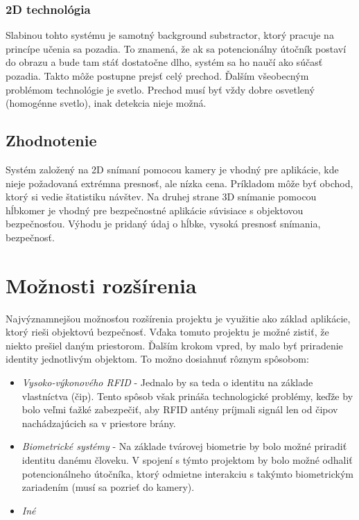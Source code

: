 \subsubsection{2D technológia}
Slabinou tohto systému je samotný background substractor, ktorý pracuje na princípe učenia sa pozadia. To znamená, že ak sa potencionálny útočník  postaví do obrazu a bude tam stáť dostatočne dlho, systém sa ho naučí ako súčasť pozadia. Takto môže postupne prejsť celý prechod. Ďalším všeobecným problémom technológie je svetlo. Prechod musí byť vždy dobre osvetlený (homogénne svetlo), inak detekcia nieje možná. 

\vspace{5mm}

\subsection{Zhodnotenie}
Systém založený na 2D snímaní pomocou kamery je vhodný pre aplikácie, kde nieje požadovaná extrémna presnosť, ale nízka cena. Príkladom môže byť obchod, ktorý si vedie štatistiku návštev. Na druhej strane 3D snímanie pomocou hĺbkomer je vhodný pre bezpečnostné aplikácie súvisiace s objektovou bezpečnosťou. Výhodu je pridaný údaj o hĺbke, vysoká presnosť snímania, bezpečnosť.       


\section{Možnosti rozšírenia}
Najvýznamnejšou možnosťou rozšírenia projektu je využitie ako základ aplikácie, ktorý rieši objektovú bezpečnosť. Vďaka tomuto projektu je možné zistiť, že niekto prešiel daným priestorom. Ďalším krokom vpred, by malo byť priradenie identity jednotlivým objektom. To možno dosiahnuť rôznym spôsobom: 

\begin{itemize}
\item \textit{Vysoko-výkonového RFID} - Jednalo by sa teda o identitu na základe vlastníctva (čip). Tento spôsob však prináša technologické problémy, keďže by bolo veľmi ťažké zabezpečiť, aby RFID antény príjmali signál len od čipov nachádzajúcich sa v priestore brány. 
\item \textit{Biometrické systémy} - Na základe tvárovej biometrie by bolo možné priradiť identitu danému človeku. V spojení s týmto projektom by bolo možné odhaliť potencionálneho útočníka, ktorý odmietne interakciu s takýmto biometrickým zariadením (musí sa pozrieť do kamery).
\item \textit{Iné} 
\end{itemize}


